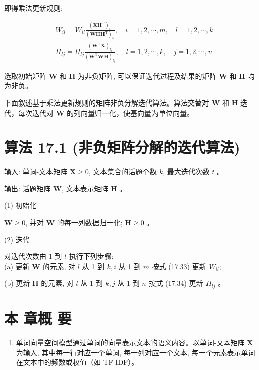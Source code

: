 \documentclass[10pt]{article}
\begin{document}
即得乘法更新规则:


\begin{align*}
& W_{i l}=W_{i l} \frac{\left(\boldsymbol{X} \boldsymbol{H}^{\mathrm{T}}\right)_{i l}}{\left(\boldsymbol{W} \boldsymbol{H} \boldsymbol{H}^{\mathrm{T}}\right)_{i l}}, \quad i=1,2, \cdots, m, \quad l=1,2, \cdots, k  \tag{17.33}\\
& H_{l j}=H_{l j} \frac{\left(\boldsymbol{W}^{\mathrm{T}} \boldsymbol{X}\right)_{l j}}{\left(\boldsymbol{W}^{\mathrm{T}} \boldsymbol{W} \boldsymbol{H}\right)_{l j}}, \quad l=1,2, \cdots, k, \quad j=1,2, \cdots, n \tag{17.34}
\end{align*}


选取初始矩阵 $\boldsymbol{W}$ 和 $\boldsymbol{H}$ 为非负矩阵, 可以保证迭代过程及结果的矩阵 $\boldsymbol{W}$ 和 $\boldsymbol{H}$ 均为非负。

下面叙述基于乘法更新规则的矩阵非负分解迭代算法。算法交替对 $\boldsymbol{W}$ 和 $\boldsymbol{H}$ 迭代，每次迭代对 $\boldsymbol{W}$ 的列向量归一化，使基向量为单位向量。

\section*{算法 17.1 (非负矩阵分解的迭代算法)}
输入: 单词-文本矩阵 $\boldsymbol{X} \geqslant 0$, 文本集合的话题个数 $k$, 最大迭代次数 $t$ 。

输出: 话题矩阵 $\boldsymbol{W}$, 文本表示矩阵 $\boldsymbol{H}$ 。

(1) 初始化

$\boldsymbol{W} \geqslant 0$, 并对 $\boldsymbol{W}$ 的每一列数据归一化; $\boldsymbol{H} \geqslant 0$ 。

(2) 迭代

对迭代次数由 1 到 $t$ 执行下列步骤:\\
(a) 更新 $\boldsymbol{W}$ 的元素, 对 $l$ 从 1 到 $k, i$ 从 1 到 $m$ 按式 (17.33) 更新 $W_{i l}$;

(b) 更新 $\boldsymbol{H}$ 的元素, 对 $l$ 从 1 到 $k, j$ 从 1 到 $n$ 按式 (17.34) 更新 $H_{l j}$ 。

\section*{本 章概 要}
\begin{enumerate}
  \item 单词向量空间模型通过单词的向量表示文本的语义内容。以单词-文本矩阵 $\boldsymbol{X}$ 为输入, 其中每一行对应一个单词, 每一列对应一个文本, 每一个元素表示单词在文本中的频数或权值（如 TF-IDF）。
\end{enumerate}
\end{document}

